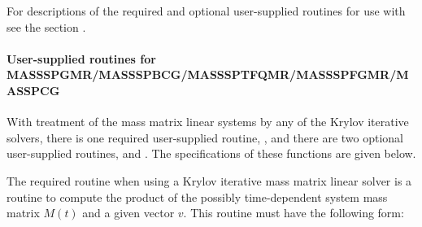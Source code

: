 \documentclass[letterpaper,10pt,english]{sphinxmanual}
\begin{document}
For descriptions of the required and optional user-supplied routines
for use with {\hyperref[f_interface/Usage:f/_/FARKMASSPCG]{\emph{}}} see the section
{\hyperref[f_interface/Usage:finterface-massspilsusersupplied]{\emph{}}}.


\paragraph{User-supplied routines for MASSSPGMR/MASSSPBCG/MASSSPTFQMR/MASSSPFGMR/MASSPCG}
\label{f_interface/Usage:user-supplied-routines-for-massspgmr-massspbcg-masssptfqmr-massspfgmr-masspcg}\label{f_interface/Usage:finterface-massspilsusersupplied}
With treatment of the mass matrix linear systems by any of the Krylov
iterative solvers, there is one required user-supplied routine,
{\hyperref[f_interface/Usage:f/_/FARKMTIMES]{\emph{}}}, and there are two optional user-supplied
routines, {\hyperref[f_interface/Usage:f/_/FARKMASSPSET]{\emph{}}} and {\hyperref[f_interface/Usage:f/_/FARKMASSPSOL]{\emph{}}}.
The specifications of these functions are given below.

The required routine when using a Krylov iterative mass matrix linear
solver is a routine to compute the product of the possibly
time-dependent system mass matrix \(M(t)\) and a given vector
\(v\).  This routine must have the following form:
\end{document}
